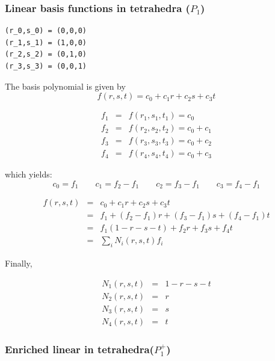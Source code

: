 

\subsubsection{Linear basis functions in tetrahedra ($P_1$)}


\begin{verbatim}
(r_0,s_0) = (0,0,0)
(r_1,s_1) = (1,0,0)
(r_2,s_2) = (0,1,0)
(r_3,s_3) = (0,0,1)
\end{verbatim}

The basis polynomial is given by
\[
f(r,s,t)=c_0 + c_1 r + c_2 s + c_3 t
\]

\begin{eqnarray}
f_1 &=& f(r_1,s_1,t_1) = c_0 \\
f_2 &=& f(r_2,s_2,t_2) = c_0 + c_1\\
f_3 &=& f(r_3,s_3,t_3) = c_0 + c_2\\
f_4 &=& f(r_4,s_4,t_4) = c_0 + c_3
\end{eqnarray}

which yields:
\[
c_0=f_1
\quad
\quad
c_1=f_2-f_1
\quad
\quad
c_2=f_3-f_1
\quad
\quad
c_3=f_4-f_1
\]

\begin{eqnarray}
f(r,s,t) 
&=& c_0 + c_1 r + c_2 s + c_3 t \nonumber\\
&=& f_1 + (f_2-f_1) r + (f_3-f_1) s + (f_4-f_1) t \nonumber\\
&=& f_1 (1-r-s-t) + f_2 r + f_3 s + f_4 t \nonumber\\
&=& \sum_i N_i(r,s,t) f_i \nonumber
\end{eqnarray}

Finally,

\begin{mdframed}[backgroundcolor=blue!5]
\begin{eqnarray}
N_1(r,s,t) &=& 1-r-s-t \nonumber\\
N_2(r,s,t) &=& r \nonumber\\
N_3(r,s,t) &=& s \nonumber\\
N_4(r,s,t) &=& t \nonumber
\end{eqnarray}
\end{mdframed}

\subsubsection{Enriched linear in tetrahedra($P_1^+$)}

